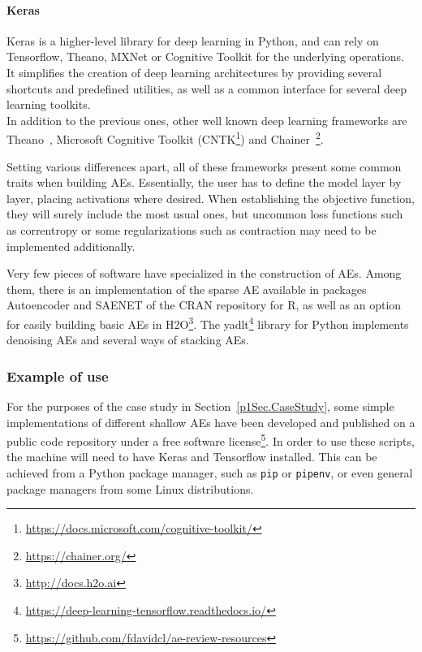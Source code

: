 \paragraph{Keras } Keras is a higher-level library for deep learning in Python, and can rely on Tensorflow, Theano, MXNet or Cognitive Toolkit for the underlying operations. It simplifies the creation of deep learning architectures by providing several shortcuts and predefined utilities, as well as a common interface for several deep learning toolkits.\\

In addition to the previous ones, other well known deep learning frameworks are Theano~, Microsoft Cognitive Toolkit (CNTK\footnote{\url{https://docs.microsoft.com/cognitive-toolkit/}}) and Chainer~\footnote{\url{https://chainer.org/}}.

Setting various differences apart, all of these frameworks present some common traits when building AEs. Essentially, the user has to define the model layer by layer, placing activations where desired. When establishing the objective function, they will surely include the most usual ones, but uncommon loss functions such as correntropy or some regularizations such as contraction may need to be implemented additionally.

Very few pieces of software have specialized in the construction of AEs. Among them, there is an implementation of the sparse AE available in packages Autoencoder  and SAENET  of the CRAN repository for R, as well as an option for easily building basic AEs in H2O\footnote{\url{http://docs.h2o.ai}}. The yadlt\footnote{\url{https://deep-learning-tensorflow.readthedocs.io/}} library for Python implements denoising AEs and several ways of stacking AEs.

\subsubsection{Example of use}

For the purposes of the case study in Section~\ref{p1Sec.CaseStudy}, some simple implementations of different shallow AEs have been developed and published on a public code repository under a free software license\footnote{\url{https://github.com/fdavidcl/ae-review-resources}}. In order to use these scripts, the machine will need to have Keras and Tensorflow installed. This can be achieved from a Python package manager, such as \texttt{pip} or \texttt{pipenv}, or even general package managers from some Linux distributions.

